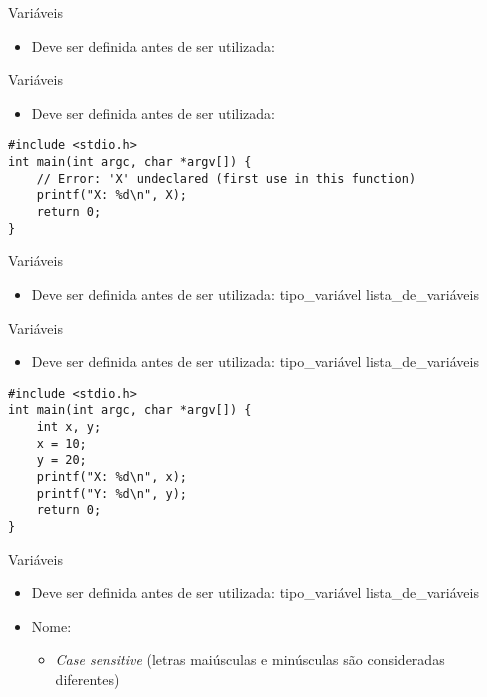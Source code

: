 \documentclass[t, aspectratio=169]{beamer}
\begin{document}
\begin{frame}[label={sec:orgec5d36d}]{Variáveis}
\begin{itemize}
\item Deve ser definida antes de ser utilizada:
\end{itemize}
\end{frame}

\begin{frame}[label={sec:org31c48f8},fragile]{Variáveis}
 \begin{itemize}
\item Deve ser definida antes de ser utilizada:
\end{itemize}
\begin{verbatim}
#include <stdio.h>
int main(int argc, char *argv[]) {
    // Error: 'X' undeclared (first use in this function)
    printf("X: %d\n", X);
    return 0;
}
\end{verbatim}
\end{frame}

\begin{frame}[label={sec:org6efb61d}]{Variáveis}
\begin{itemize}
\item Deve ser definida antes de ser utilizada: \alert{\color{highlight}tipo\_variável \color{blue!80}lista\_de\_variáveis}
\end{itemize}
\end{frame}

\begin{frame}[label={sec:orga125290},fragile]{Variáveis}
 \begin{itemize}
\item Deve ser definida antes de ser utilizada: \alert{\color{highlight}tipo\_variável \color{blue!80}lista\_de\_variáveis}
\end{itemize}
\begin{verbatim}
#include <stdio.h>
int main(int argc, char *argv[]) {
    int x, y;
    x = 10;
    y = 20;
    printf("X: %d\n", x);
    printf("Y: %d\n", y);
    return 0;
}
\end{verbatim}
\end{frame}

\begin{frame}[label={sec:org3c29519}]{Variáveis}
\begin{itemize}
\item Deve ser definida antes de ser utilizada: \alert{\color{highlight}tipo\_variável \color{blue!80}lista\_de\_variáveis}
\item \color{black}Nome:
\begin{itemize}
\item \emph{Case sensitive} (letras maiúsculas e minúsculas são consideradas diferentes)
\end{itemize}
\end{itemize}
\end{frame}
\end{document}
